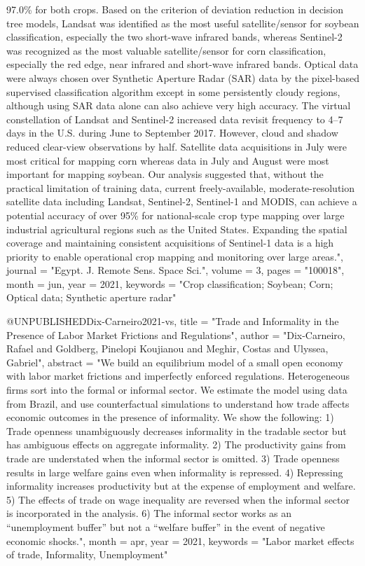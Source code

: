 {{	97.0\% for both crops. Based on the criterion of deviation
	reduction in decision tree models, Landsat was identified as the
	most useful satellite/sensor for soybean classification,
	especially the two short-wave infrared bands, whereas Sentinel-2
	was recognized as the most valuable satellite/sensor for corn
	classification, especially the red edge, near infrared and
	short-wave infrared bands. Optical data were always chosen over
	Synthetic Aperture Radar (SAR) data by the pixel-based supervised
	classification algorithm except in some persistently cloudy
	regions, although using SAR data alone can also achieve very high
	accuracy. The virtual constellation of Landsat and Sentinel-2
	increased data revisit frequency to 4--7 days in the U.S. during
	June to September 2017. However, cloud and shadow reduced
	clear-view observations by half. Satellite data acquisitions in
	July were most critical for mapping corn whereas data in July and
	August were most important for mapping soybean. Our analysis
	suggested that, without the practical limitation of training
	data, current freely-available, moderate-resolution satellite
	data including Landsat, Sentinel-2, Sentinel-1 and MODIS, can
	achieve a potential accuracy of over 95\% for national-scale crop
	type mapping over large industrial agricultural regions such as
	the United States. Expanding the spatial coverage and maintaining
	consistent acquisitions of Sentinel-1 data is a high priority to
	enable operational crop mapping and monitoring over large areas.",
	journal  = "Egypt. J. Remote Sens. Space Sci.",
	volume   =  3,
	pages    = "100018",
	month    =  jun,
	year     =  2021,
	keywords = "Crop classification; Soybean; Corn; Optical data; Synthetic
	aperture radar"
}

@UNPUBLISHED{Dix-Carneiro2021-vs,
	title    = "Trade and Informality in the Presence of Labor Market Frictions
	and Regulations",
	author   = "Dix-Carneiro, Rafael and Goldberg, Pinelopi Koujianou and Meghir,
	Costas and Ulyssea, Gabriel",
	abstract = "We build an equilibrium model of a small open economy with labor
	market frictions and imperfectly enforced regulations.
	Heterogeneous firms sort into the formal or informal sector. We
	estimate the model using data from Brazil, and use counterfactual
	simulations to understand how trade affects economic outcomes in
	the presence of informality. We show the following: 1) Trade
	openness unambiguously decreases informality in the tradable
	sector but has ambiguous effects on aggregate informality. 2) The
	productivity gains from trade are understated when the informal
	sector is omitted. 3) Trade openness results in large welfare
	gains even when informality is repressed. 4) Repressing
	informality increases productivity but at the expense of
	employment and welfare. 5) The effects of trade on wage
	inequality are reversed when the informal sector is incorporated
	in the analysis. 6) The informal sector works as an
	``unemployment buffer'' but not a ``welfare buffer'' in the event
	of negative economic shocks.",
	month    =  apr,
	year     =  2021,
	keywords = "Labor market effects of trade, Informality, Unemployment"
}

}
